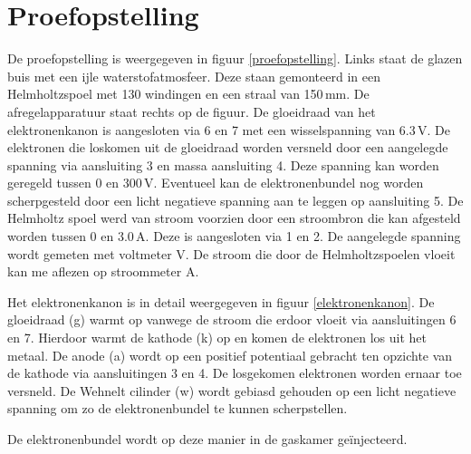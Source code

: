 \section{Proefopstelling}


De proefopstelling is weergegeven in figuur \ref{proefopstelling}. Links staat 
de glazen buis met een ijle waterstofatmosfeer. Deze staan gemonteerd in een 
Helmholtzspoel met 130 windingen en een straal van 150\,mm. De 
afregelapparatuur staat rechts op de figuur. De gloeidraad van het 
elektronenkanon is aangesloten via 6 en 7 met een wisselspanning van 6.3\,V. De 
elektronen die loskomen uit de gloeidraad worden versneld door een aangelegde 
spanning via aansluiting 3 en massa aansluiting 4. Deze spanning kan worden 
geregeld tussen 0 en 300\,V. Eventueel kan de elektronenbundel nog worden 
scherpgesteld door een licht negatieve spanning aan te leggen op aansluiting 5.  
De Helmholtz spoel werd van stroom voorzien door een stroombron die kan 
afgesteld worden tussen 0 en 3.0\,A. Deze is aangesloten via 1 en 2. De 
aangelegde spanning wordt gemeten met voltmeter V. De stroom die door de 
Helmholtzspoelen vloeit kan me aflezen op stroommeter A.


Het elektronenkanon is in detail weergegeven in figuur \ref{elektronenkanon}.  
De gloeidraad (g) warmt op vanwege de stroom die erdoor vloeit via 
aansluitingen 6 en 7. Hierdoor warmt de kathode (k) op en komen de elektronen 
los uit het metaal. De anode (a) wordt op een positief potentiaal gebracht ten 
opzichte van de kathode via aansluitingen 3 en 4.  De losgekomen elektronen 
worden ernaar toe versneld.  De Wehnelt cilinder (w) wordt gebiasd gehouden op 
een licht negatieve spanning om zo de elektronenbundel te kunnen scherpstellen.

De elektronenbundel wordt op deze manier in de gaskamer ge\"injecteerd.
